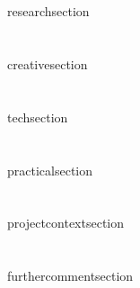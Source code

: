 \documentclass[11pt]{article} %
\begin{document}
\ifdefined\ResearchSection
  \section*{\ResearchSection}
  \label{research}
  {researchsection}
\fi


\ifdefined\CreativeApproach
  \section*{\CreativeApproach}
  \label{creative}
  {creativesection}
\fi

\ifdefined\TechApproach
  \section*{\TechApproach}
  \label{tech}
  {techsection}
\fi

\ifdefined\PracticalApproach
  \section*{\PracticalApproach}
  \label{practical}
  {practicalsection}
\fi

\ifdefined\ProjectContext
  \section*{\ProjectContext}
  \label{context}
  {projectcontextsection}
\fi

\ifdefined\FurtherComments
  \section*{\FurtherComments}
  \label{further}
  {furthercommentsection}
\fi

\clearpage


\printbibliography[title={Bibliography}, heading=bibintoc] %
\label{references}
\nocite{*}
\end{document}
